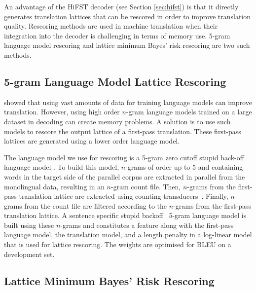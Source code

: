 An advantage of the HiFST decoder (see Section \ref{sec:hifst}) is that it directly %
generates translation lattices that can be rescored in order to improve translation quality.
Rescoring methods are used in machine translation when their integration into the decoder
is challenging in terms of memory use. 5-gram language model rescoring and lattice minimum
Bayes' risk rescoring are two such methods.

\subsection{5-gram Language Model Lattice Rescoring}

\citet{brants-popat-xu-och-dean:2007:EMNLP-CoNLL} showed that using vast
amounts of data for training language models can improve translation. However,
using high order $n$-gram language models trained on
a large dataset in decoding can create memory problems. %
A solution is to use such models to rescore the output
lattice of a first-pass translation. These first-pass lattices are generated
using a lower
order language model.

The language model we use for rescoring is a 5-gram zero cutoff stupid back-off language model \cite{brants-popat-xu-och-dean:2007:EMNLP-CoNLL}.
To build this model, $n$-grams of order up to 5 and containing words in the target side of the parallel corpus 
are extracted in parallel from the monolingual data, resulting in an $n$-gram count file.
Then, $n$-grams from the first-pass translation lattice 
are extracted using counting transducers~\citep{allauzen:03}.
Finally, $n$-grams from the count file are filtered according to the $n$-grams from the first-pass 
translation lattice. A sentence specific stupid backoff~\citep{brants-popat-xu-och-dean:2007:EMNLP-CoNLL}
5-gram language model is built using these $n$-grams and constitutes a feature along with the first-pass
language model, the translation model, and a length penalty in a log-linear model that is used
for lattice rescoring. The weights are optimised for BLEU on a development set.

\subsection{Lattice Minimum Bayes' Risk Rescoring} \label{sec:lmbr}


